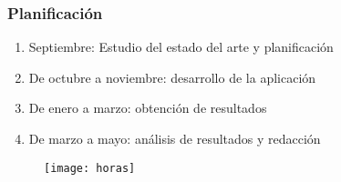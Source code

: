 

\begin{frame}
	\frametitle{Planificación}
	
	
	\begin{enumerate}
		\item Septiembre: Estudio del estado del arte y planificación
		\item De octubre a noviembre: desarrollo de la aplicación
		\item De enero a marzo: obtención de resultados
		\item De marzo a mayo: análisis de resultados y redacción
	\end{enumerate}
	\begin{figure}
		\centering
		\texttt{[image: horas]}
	\end{figure}
	
	
\end{frame}

